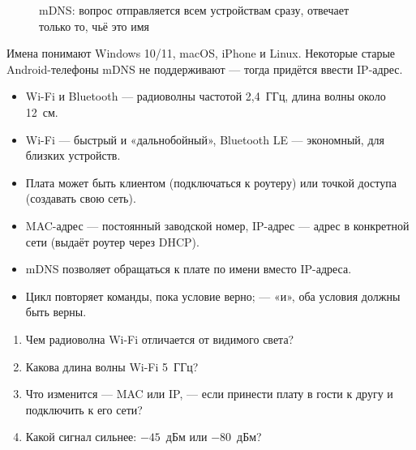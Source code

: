 \begin{figure}[H]
\centering
{}
\caption{mDNS: вопрос отправляется всем устройствам сразу, отвечает только то, чьё это имя}
\end{figure}

\begin{tip}
Имена  понимают Windows 10/11, macOS, iPhone и Linux. Некоторые старые Android-телефоны
mDNS не поддерживают --- тогда придётся ввести IP-адрес.
\end{tip}

\begin{summary}
\begin{itemize}[leftmargin=*]
  \item Wi-Fi и Bluetooth --- радиоволны частотой 2,4~ГГц, длина волны около 12~см.
  \item Wi-Fi --- быстрый и «дальнобойный», Bluetooth LE --- экономный, для близких устройств.
  \item Плата может быть клиентом (подключаться к роутеру) или точкой доступа (создавать свою сеть).
  \item MAC-адрес --- постоянный заводской номер, IP-адрес --- адрес в конкретной сети (выдаёт роутер через DHCP).
  \item mDNS позволяет обращаться к плате по имени  вместо IP-адреса.
  \item Цикл  повторяет команды, пока условие верно; \code{\&\&} --- «и», оба условия должны быть верны.
\end{itemize}
\end{summary}

\begin{quiz}
\begin{enumerate}
  \item Чем радиоволна Wi-Fi отличается от видимого света?
  \item Какова длина волны Wi-Fi 5~ГГц?
  \item Что изменится --- MAC или IP, --- если принести плату в гости к другу и подключить к его сети?
  \item Какой сигнал сильнее: $-45$~дБм или $-80$~дБм?
\end{enumerate}
\end{quiz}


